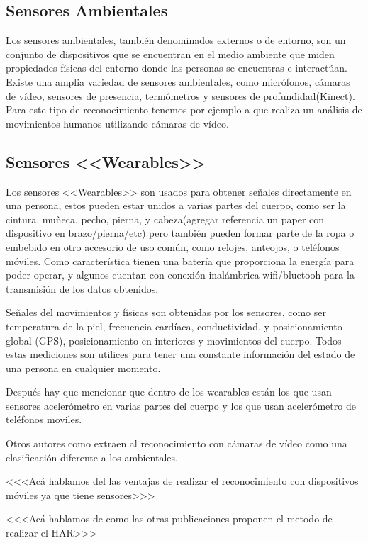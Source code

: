 \subsection{Sensores Ambientales}

Los sensores ambientales, también denominados externos o de entorno, son un conjunto de dispositivos que se encuentran en el medio ambiente que miden propiedades físicas del entorno donde las personas se encuentras e interactúan. Existe una amplia variedad de sensores ambientales, como micrófonos, cámaras de vídeo, sensores de presencia, termómetros y sensores de profundidad(Kinect). Para este tipo de reconocimiento tenemos por ejemplo a \cite{Poppe2007} que realiza un análisis de movimientos humanos utilizando cámaras de vídeo.

\subsection{Sensores <<Wearables>>}

Los sensores <<Wearables>> son usados para obtener señales directamente en una persona, estos pueden estar unidos a varias partes del cuerpo, como ser la cintura, muñeca, pecho, pierna, y cabeza(agregar referencia un paper con dispositivo en brazo/pierna/etc) pero también pueden formar parte de la ropa o embebido en otro accesorio de uso común, como relojes, anteojos, o teléfonos móviles. Como característica tienen una batería que proporciona la energía para poder operar, y algunos cuentan con conexión inalámbrica wifi/bluetooh para la transmisión de los datos obtenidos.

Señales del movimientos y físicas son obtenidas por los sensores, como ser temperatura de la piel, frecuencia cardíaca, conductividad, y posicionamiento global (GPS), posicionamiento en interiores y movimientos del cuerpo. Todos estas mediciones son utilices para tener una constante información del estado de una persona en cualquier momento.



Después hay que mencionar que dentro de los wearables están los que usan sensores acelerómetro en varias partes del cuerpo y los que usan acelerómetro de teléfonos moviles.

Otros autores como \cite{karmul2010} extraen al reconocimiento con cámaras de vídeo como una clasificación diferente a los ambientales. 


<<<Acá hablamos del las ventajas de realizar el reconocimiento con dispositivos móviles ya que tiene sensores>>>

<<<Acá hablamos de como las otras publicaciones proponen el metodo de realizar el HAR>>>



